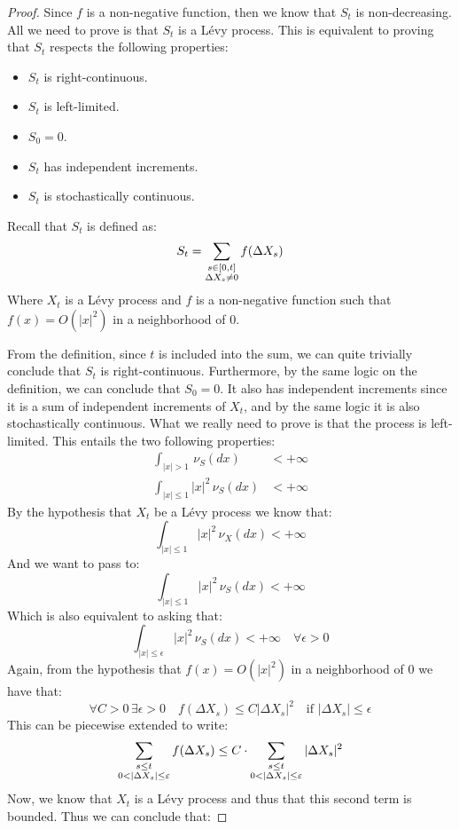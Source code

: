 \begin{proof}
Since $f$ is a non-negative function, then we know that $S_t$ is non-decreasing.
All we need to prove is that $S_t$ is a L\'evy process. This is equivalent to
proving that $S_t$ respects the following properties:
\begin{itemize}
    \item $S_t$ is right-continuous.
    \item $S_t$ is left-limited.
    \item $S_0 = 0$.
    \item $S_t$ has independent increments.
    \item $S_t$ is stochastically continuous.
\end{itemize}

Recall that $S_t$ is defined as:
\[ S_t = \sum_{\begin{subarray}{c} s\in[0,t] \\ \Delta X_s \neq 0 \end{subarray}}
    f(\Delta X_s) \]
Where $X_t$ is a L\'evy process and $f$ is a non-negative function such that
$f(x) = O(|x|^2)$ in a neighborhood of $0$. 

From the definition, since $t$ is included into the sum, we can quite trivially
conclude that $S_t$ is right-continuous. Furthermore, by the same logic on the
definition, we can conclude that $S_0 = 0$.
It also has independent increments since it is a sum of independent increments
of $X_t$, and by the same logic it is also stochastically continuous.
What we really need to prove is that the process is left-limited.
This entails the two following properties:
\begin{align*}
    \int_{|x|>1} \, \nu_S(dx) & < +\infty \\
    \int_{|x|\leq1} |x|^2 \, \nu_S(dx) & < +\infty
\end{align*}
By the hypothesis that $X_t$ be a L\'evy process we know that:
\[ \int_{|x|\leq1} |x|^2 \, \nu_X(dx) < +\infty \]
And we want to pass to:
\[ \int_{|x|\leq1} |x|^2 \, \nu_S(dx) < +\infty \]
Which is also equivalent to asking that:
\[ \int_{|x|\leq\epsilon} |x|^2 \, \nu_S(dx) < +\infty \quad \forall \epsilon >
    0 \]
Again, from the hypothesis that $f(x) = O(|x|^2)$ in a neighborhood of $0$ we
have that:
\[ \forall C>0 \, \exists \epsilon > 0 \quad f(\Delta X_s) \leq C |\Delta X_s|^2
    \quad \text{if } |\Delta X_s| \leq \epsilon \]
This can be piecewise extended to write:
\[ \sum_{\begin{subarray}{c} s\leq t \\ 0 < |\Delta X_s| \leq \epsilon
\end{subarray}} f(\Delta X_s) \leq C \cdot \sum_{\begin{subarray}{c} s\leq t \\
0 < |\Delta X_s| \leq \epsilon \end{subarray}} |\Delta X_s|^2 \]
Now, we know that $X_t$ is a L\'evy process and thus that this second term is
bounded. Thus we can conclude that:


\end{proof}
